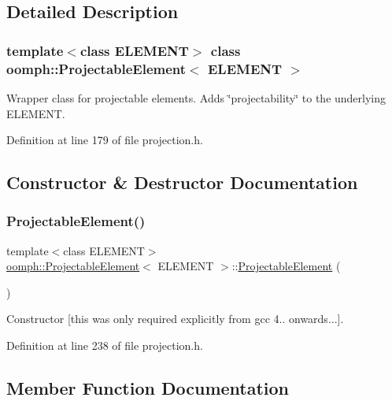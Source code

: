 \subsection{Detailed Description}
\subsubsection*{template$<$class E\+L\+E\+M\+E\+NT$>$\newline
class oomph\+::\+Projectable\+Element$<$ E\+L\+E\+M\+E\+N\+T $>$}

Wrapper class for projectable elements. Adds \char`\"{}projectability\char`\"{} to the underlying E\+L\+E\+M\+E\+NT. 

Definition at line 179 of file projection.\+h.



\subsection{Constructor \& Destructor Documentation}
\mbox{\label{classoomph_1_1ProjectableElement_a1892a2e757d35952be803d56078a3320}} 
\subsubsection{\texorpdfstring{Projectable\+Element()}{ProjectableElement()}}
{\footnotesize\ttfamily template$<$class E\+L\+E\+M\+E\+NT$>$ \\
\hyperlink{classoomph_1_1ProjectableElement}{oomph\+::\+Projectable\+Element}$<$ E\+L\+E\+M\+E\+NT $>$\+::\hyperlink{classoomph_1_1ProjectableElement}{Projectable\+Element} (\begin{DoxyParamCaption}{ }\end{DoxyParamCaption})\hspace{0.3cm}{\ttfamily [inline]}}



Constructor \mbox{[}this was only required explicitly from gcc 4.. onwards...\mbox{]}. 



Definition at line 238 of file projection.\+h.



\subsection{Member Function Documentation}
\mbox{\label{classoomph_1_1ProjectableElement_a9e7e6d213f5e28d4b1e91433d4efb74c}} 
